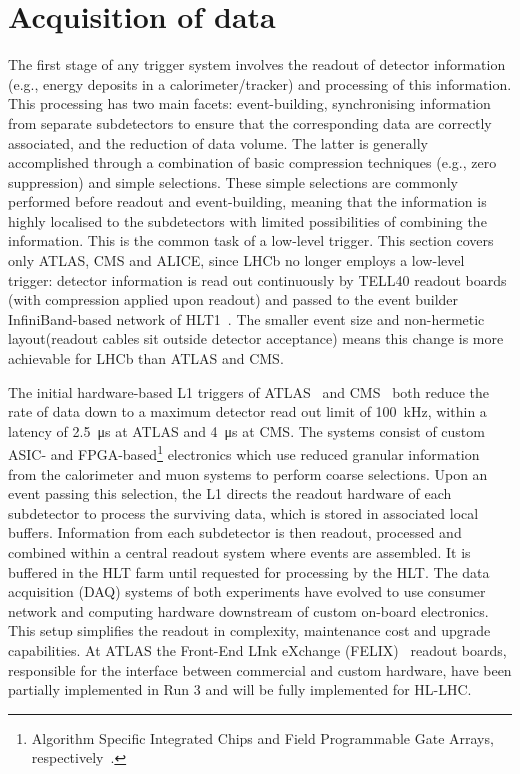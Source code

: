 \section{Acquisition of data}
The first stage of any trigger system involves the readout of detector information (e.g.,  energy deposits in a calorimeter/tracker) and processing of this information. This processing has two main facets: event-building, synchronising information from separate subdetectors to ensure that the corresponding data are correctly associated, and the reduction of data volume. The latter is generally accomplished through a combination of basic compression techniques (e.g., zero suppression) and simple selections. These simple selections are commonly performed before readout and event-building, meaning that the information is highly localised to the subdetectors with limited possibilities of combining the information. This is the common task of a low-level trigger. This section covers only ATLAS, CMS and ALICE, since LHCb no longer employs a low-level trigger: detector information is read out continuously by TELL40 readout boards (with compression applied upon readout) and passed to the event builder InfiniBand-based network of HLT1~\cite{LHCb:2023hlw}. The smaller event size and non-hermetic layout(readout cables sit outside detector acceptance) means this change is more achievable for LHCb than ATLAS and CMS.


The initial hardware-based L1 triggers of ATLAS~\cite{ATLASRun3Detector} and CMS~\cite{cms2023development} both reduce the rate of data down to a maximum detector read out limit of \SI{100}{\kilo\hertz}, within a latency of \SI{2.5}{\micro\second} at ATLAS and \SI{4}{\micro\second} at CMS. The systems consist of custom ASIC- and FPGA-based\footnote{Algorithm Specific Integrated Chips and Field Programmable Gate Arrays, respectively~\cite{asics-fpgas}.} electronics which use reduced granular information from the calorimeter and muon systems to perform coarse selections. Upon an event passing this selection, the L1 directs the readout hardware of each subdetector to process the surviving data, which is stored in associated local buffers. Information from each subdetector is  then readout, processed and combined within a central readout system where events are assembled. It is buffered in the HLT farm until requested for processing by the HLT. The data acquisition (DAQ) systems of both experiments have evolved to use consumer network and computing hardware downstream of custom on-board electronics. This setup simplifies the readout in complexity, maintenance cost and upgrade capabilities. At ATLAS the Front-End LInk eXchange (FELIX)~\cite{ATLAS:FELIX} readout boards, responsible for the interface between commercial and custom hardware, have been partially implemented in Run 3 and will be fully implemented for HL-LHC.


